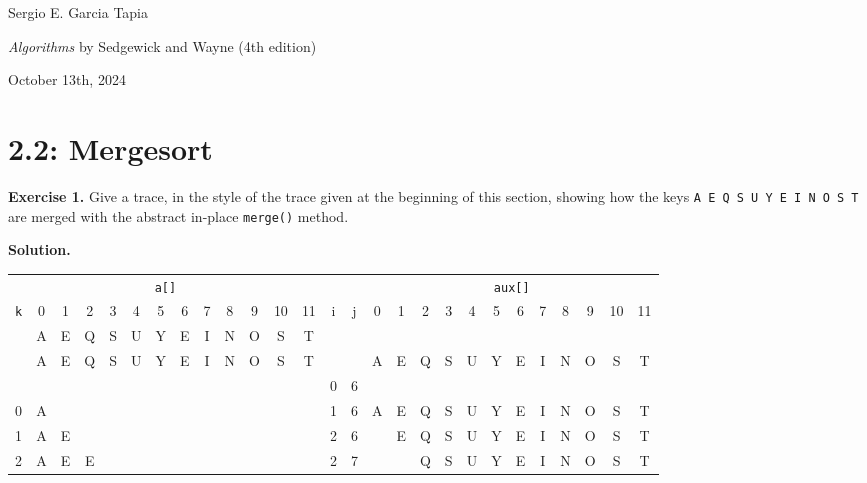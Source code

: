 \documentclass[12pt, a4paper]{article}
\newenvironment{ex}[2][Exercise]
{\par\medskip\noindent \textbf{#1 #2.}}
{\medskip}
\newenvironment{sol}[1][Solution]
{\par\medskip\noindent \textbf{#1.} }
{\medskip}
\begin{document}
	\noindent Sergio E. Garcia Tapia \hfill
	
	\noindent \emph{Algorithms} by Sedgewick and Wayne (4th edition) \cite{sedgewick_wayne}\hfill
	
	\noindent October 13th, 2024\hfill 
	\section*{2.2: Mergesort}
	\begin{ex}{1}
		Give a trace, in the style of the trace given at the beginning of this section,
		showing how the keys \texttt{A E Q S U Y E I N O S T} are merged with the abstract
		in-place \texttt{merge()} method.
	\end{ex}
	\begin{sol}
		\begin{center}
			{\scriptsize
			\begin{tabular}{c|cccccccccccc|cc|cccccc|cccccc}
				\multicolumn{13}{c}{\texttt{a[]}} & {} & {} & \multicolumn{12}{c}{\texttt{aux[]}}\\
				\texttt{k} & 0 & 1 & 2 & 3 & 4 & 5 & 6 & 7 & 8 & 9 & 10 & 11
				& i & j
				& 0 & 1 & 2 & 3 & 4 & 5 & 6 & 7 & 8 & 9 & 10 & 11\\
				
				\hline
				
				{} & A & E & Q & S & U & Y & E & I & N & O & S & T &
				{} & {}
				& {} & {} &{} &{} & {} & {} & {} & {} & {} & {} & {} & {}\\
				
				{} & A & E & Q & S & U & Y & E & I & N & O & S & T
				& {} & {}
				& A & E & Q & S & U & Y & E & I & N & O & S & T \\
				
				{} & {} & {} &{} &{} & {} & {} & {} & {} & {} & {} & {} & {}
				& 0 & 6
				& {} & {} &{} &{} & {} & {} & {} & {} & {} & {} & {} & {} \\
				
				0 & {\color{red} A} & {} &{} &{} & {} & {} & {} & {} & {} & {} & {} & {}
				& 1 & 6
				& {\color{red}A} & E & Q & S & U & Y & E & I & N & O & S & T\\
				
				1 & {\color{gray} A} & {\color{red}E} &{} &{} & {} & {} & {} & {} & {} & {} & {} & {}
				& 2 & 6
				& {} & {\color{red}E} & Q & S & U & Y & E & I & N & O & S & T \\
				
				2 & {\color{gray} A} & {\color{gray}E} & {\color{red}E} &{} & {} & {} & {} & {} & {} & {} & {} & {}
				& 2 & 7
				& {} & {} & Q & S & U & Y
				& {\color{red}E} & I & N & O & S & T \\
				

\end{tabular}}
\end{center}
\end{sol}
\end{document}
